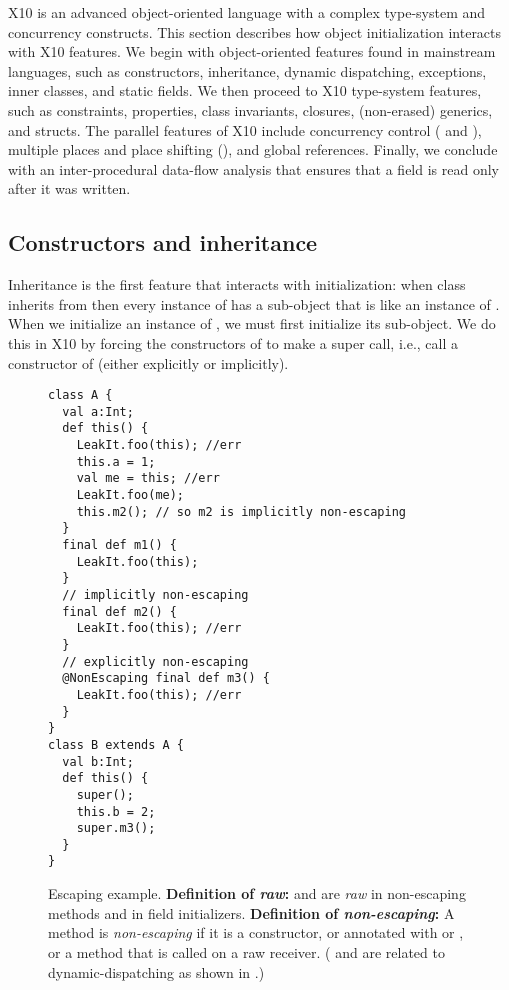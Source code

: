 X10 is an advanced object-oriented language with a complex type-system
    and concurrency constructs.
This section describes how object initialization interacts with X10 features.
We begin with object-oriented features found in mainstream languages,
    such as constructors, inheritance, dynamic dispatching, exceptions, inner classes,
    and static fields.
We then proceed to X10 type-system features,
    such as constraints, properties, class invariants, closures, (non-erased) generics, and structs.
The parallel features of X10 include concurrency control ( and ),
    multiple places and place shifting (), and global references.
Finally, we conclude with an inter-procedural data-flow analysis that ensures that
    a field is read only after it was written.


\subsection{Constructors and inheritance}
Inheritance is the first feature that interacts with initialization:
    when class  inherits from 
    then every instance of  has a sub-object that is like an instance of .
When we initialize an instance of , we must first initialize its  sub-object.
We do this in X10 by forcing the constructors of  to make a super call,
    i.e., call a constructor of 
    (either explicitly or implicitly).



\begin{figure}
\begin{lstlisting}
class A {
  val a:Int;
  def this() {
    LeakIt.foo(this); //err
    this.a = 1;
    val me = this; //err
    LeakIt.foo(me);
    this.m2(); // so m2 is implicitly non-escaping
  }
  final def m1() {
    LeakIt.foo(this);
  }
  // implicitly non-escaping
  final def m2() {
    LeakIt.foo(this); //err
  }
  // explicitly non-escaping
  @NonEscaping final def m3() {
    LeakIt.foo(this); //err
  }
}
class B extends A {
  val b:Int;
  def this() {
    super();
    this.b = 2;
    super.m3();
  }
}
\end{lstlisting}
\caption{Escaping \this example.
    \textbf{Definition of \emph{raw}:}
    {\this and  are \emph{raw} in {non-escaping} methods and in field initializers}.
    \textbf{Definition of \emph{non-escaping}:}
        {A method is \emph{non-escaping} if it is a constructor,
            or annotated with  or ,
            or a method that is called on a raw \this receiver}.
    ( and  are related
        to dynamic-dispatching as shown in .)}
\label{Figure:Escaping-this}
\end{figure}

